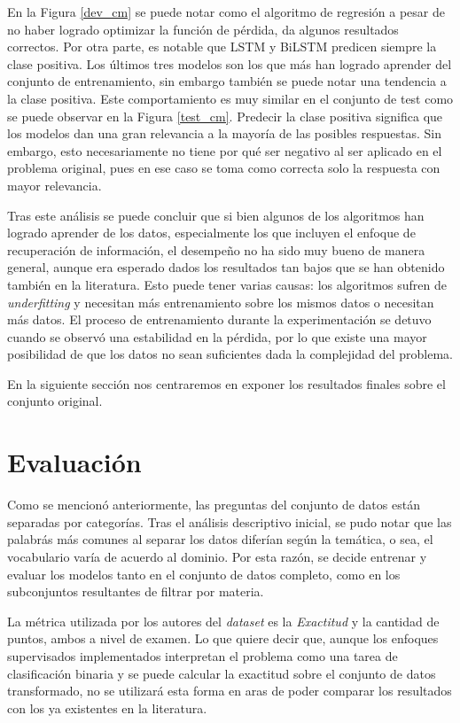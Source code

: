 En la Figura \ref{dev_cm} se puede notar como el algoritmo de regresión a pesar de no haber logrado optimizar la función de pérdida, da algunos resultados correctos. Por otra parte, es notable que LSTM y BiLSTM predicen siempre la clase positiva. Los últimos tres modelos son los que más han logrado aprender del conjunto de entrenamiento, sin embargo también se puede notar una tendencia a la clase positiva. Este comportamiento es muy similar en el conjunto de test como se puede observar en la Figura \ref{test_cm}. Predecir la clase positiva significa que los modelos dan una gran relevancia a la mayoría de las posibles respuestas. Sin embargo, esto necesariamente no tiene por qué ser negativo al ser aplicado en el problema original, pues en ese caso se toma como correcta solo la respuesta con mayor relevancia.

Tras este análisis se puede concluir que si bien algunos de los algoritmos han logrado aprender de los datos, especialmente los que incluyen el enfoque de recuperación de información, el desempeño no ha sido muy bueno de manera general, aunque era esperado dados los resultados tan bajos que se han obtenido también en la literatura. Esto puede tener varias causas: los algoritmos sufren de \textit{underfitting} y necesitan más entrenamiento sobre los mismos datos o necesitan más datos. El proceso de entrenamiento durante la experimentación se detuvo cuando se observó una estabilidad en la pérdida, por lo que existe una mayor posibilidad de que los datos no sean suficientes dada la complejidad del problema.

En la siguiente sección nos centraremos en exponer los resultados finales sobre el conjunto original.

\section{Evaluación}

Como se mencionó anteriormente, las preguntas del conjunto de datos están separadas por categorías. Tras el análisis descriptivo inicial, se pudo notar que las palabrás más comunes al separar los datos diferían según la temática, o sea, el vocabulario varía de acuerdo al dominio. Por esta razón, se decide entrenar y evaluar los modelos tanto en el conjunto de datos completo, como en los subconjuntos resultantes de filtrar por materia.

La métrica utilizada por los autores del \textit{dataset} es la \textit{Exactitud} y la cantidad de puntos, ambos a nivel de examen. Lo que quiere decir que, aunque los enfoques supervisados implementados interpretan el problema como una tarea de clasificación binaria y se puede calcular la exactitud sobre el conjunto de datos transformado, no se utilizará esta forma en aras de poder comparar los resultados con los ya existentes en la literatura. 

